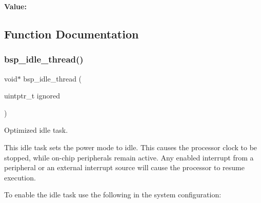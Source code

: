 {\bfseries Value\+:}
\begin{DoxyCode}{0}
\DoxyCodeLine{\textcolor{keywordflow}{do} \{ \(\backslash\)}
\DoxyCodeLine{    \} \(\backslash\)}

\end{DoxyCode}


\subsection{Function Documentation}
\mbox{\label{group__RTEMSBSPsARMLPC32XX_ga4617d29eb64a6f41a54d9f997b97d758}} 
\subsubsection{\texorpdfstring{bsp\_idle\_thread()}{bsp\_idle\_thread()}}
{\footnotesize\ttfamily void$\ast$ bsp\+\_\+idle\+\_\+thread (\begin{DoxyParamCaption}\item[{uintptr\+\_\+t}]{ignored }\end{DoxyParamCaption})}



Optimized idle task. 

This idle task sets the power mode to idle. This causes the processor clock to be stopped, while on-\/chip peripherals remain active. Any enabled interrupt from a peripheral or an external interrupt source will cause the processor to resume execution.

To enable the idle task use the following in the system configuration\+:


\begin{DoxyCode}{0}
\DoxyCodeLine{\textcolor{preprocessor}{\#include <bsp.h>}}
\DoxyCodeLine{}
\DoxyCodeLine{\textcolor{preprocessor}{\#define CONFIGURE\_INIT}}
\DoxyCodeLine{}
\DoxyCodeLine{\textcolor{preprocessor}{\#define CONFIGURE\_IDLE\_TASK\_BODY bsp\_idle\_thread}}
\DoxyCodeLine{}
\end{DoxyCode}


